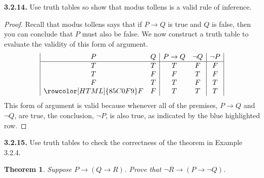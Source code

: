\documentclass[12pt]{amsart}
\newenvironment{statement}[1]{\smallskip\noindent\color[rgb]{.6627, .3529, .6314} {\bf #1.}}{}
\newtheorem{theorem}{Theorem}
\theoremstyle{definition}
\theoremstyle{remark}
\begin{document}
\begin{statement}{3.2.14}
Use truth tables so show that modus tollens is a valid rule of inference.
\end{statement}

\begin{proof}
Recall that modus tollens says that if $P \rightarrow Q$ is true and $Q$ is false, then you can conclude that $P$ must also be false.
We now construct a truth table to evaluate the validity of this form of argument.
\begin{equation*}
	\begin{array}{| c c | c c | c |}
		P & Q & P \rightarrow Q & \neg Q & \neg P \\
		\hline
		T & T & T & F & F \\
		T & F & F & T & F \\
		F & T & T & F & T \\
		\rowcolor[HTML]{85C0F9} F & F & T & T & T
	\end{array}
\end{equation*}
This form of argument is valid because whenever all of the premises, $P \rightarrow Q$ and $\neg Q$, are true, the conclusion, $\neg P$, is also true, as indicated by the blue highlighted row.
\end{proof}


\begin{statement}{3.2.15}
Use truth tables to check the correctness of the theorem in Example 3.2.4.
\begin{theorem}
	Suppose $P \rightarrow (Q \rightarrow R)$.
	Prove that $\neg R \rightarrow (P \rightarrow \neg Q)$.
\end{theorem}
\end{statement}
\end{document}
